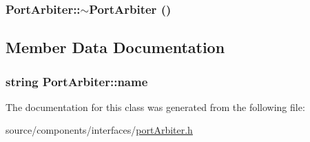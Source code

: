 \hypertarget{classPortArbiter_96aa09e1d40630906ffe56fbca7cd984}{
\subsubsection[{$\sim$PortArbiter}]{\setlength{\rightskip}{0pt plus 5cm}PortArbiter::$\sim$PortArbiter ()}}
\label{classPortArbiter_96aa09e1d40630906ffe56fbca7cd984}




\subsection{Member Data Documentation}
\hypertarget{classPortArbiter_0a44c855daa1f7b41013a5c09ab27f95}{
\subsubsection[{name}]{\setlength{\rightskip}{0pt plus 5cm}string {\bf PortArbiter::name}}}
\label{classPortArbiter_0a44c855daa1f7b41013a5c09ab27f95}




The documentation for this class was generated from the following file:\begin{CompactItemize}
\item 
source/components/interfaces/\hyperlink{portArbiter_8h}{portArbiter.h}\end{CompactItemize}
